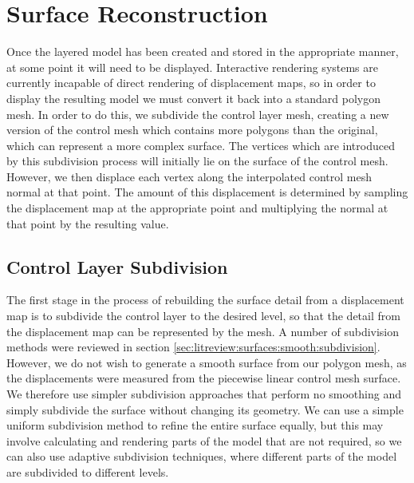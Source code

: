 \section{\label{sec:dispmapanim:reconstruction}Surface Reconstruction}

Once the layered model has been created and stored in the appropriate manner, at some point it will need to be displayed. Interactive rendering systems are currently incapable of direct rendering of displacement maps, so in order to display the resulting model we must convert it back into a standard polygon mesh. In order to do this, we subdivide the control layer mesh, creating a new version of the control mesh which contains more polygons than the original, which can represent a more complex surface. The vertices which are introduced by this subdivision process will initially lie on the surface of the control mesh. However, we then displace each vertex along the interpolated control mesh normal at that point. The amount of this displacement is determined by sampling the displacement map at the appropriate point and multiplying the normal at that point by the resulting value.

\subsection{\label{sec:dispmapanim:reconstruction:subdivision}Control Layer Subdivision}

The first stage in the process of rebuilding the surface detail from a displacement map is to subdivide the control layer to the desired level, so that the detail from the displacement map can be represented by the mesh. A number of subdivision methods were reviewed in section \ref{sec:litreview:surfaces:smooth:subdivision}. However, we do not wish to generate a smooth surface from our polygon mesh, as the displacements were measured from the piecewise linear control mesh surface. We therefore use simpler subdivision approaches that perform no smoothing and simply subdivide the surface without changing its geometry. We can use a simple uniform subdivision method to refine the entire surface equally, but this may involve calculating and rendering parts of the model that are not required, so we can also use adaptive subdivision techniques, where different parts of the model are subdivided to different levels.

